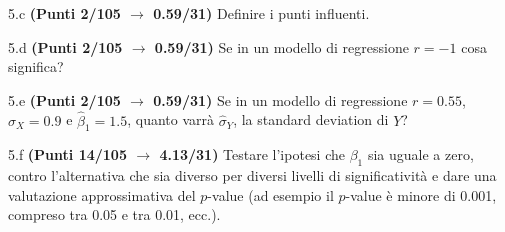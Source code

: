 \documentclass[
  11pt,
]{book}
\theoremstyle{mytheoremstyle}
\theoremstyle{mydefstyle}
\begin{document}
5.c \textbf{(Punti 2/105 \(\rightarrow\) 0.59/31)} Definire i punti influenti.

5.d \textbf{(Punti 2/105 \(\rightarrow\) 0.59/31)} Se in un modello di regressione \(r=-1\) cosa significa?

5.e \textbf{(Punti 2/105 \(\rightarrow\) 0.59/31)} Se in un modello di regressione \(r=0.55\), \(\hat\sigma_X=0.9\) e \(\hat\beta_1=1.5\), quanto varrà
\(\hat\sigma_Y\), la standard deviation di \(Y\)?

5.f \textbf{(Punti 14/105 \(\rightarrow\) 4.13/31)} Testare l'ipotesi che \(\beta_1\) sia uguale a zero, contro l'alternativa che sia diverso per diversi livelli di significatività e dare una valutazione approssimativa del \(p\)-value (ad esempio il \(p\)-value è minore di 0.001, compreso tra 0.05 e tra 0.01, ecc.).
\end{document}
